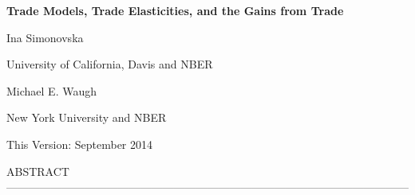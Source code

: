 \documentclass[12pt,dvips, ps2pdf]{article}
\begin{document}
\begin{onehalfspacing}

\large \textbf{Trade Models, Trade Elasticities, and the Gains from Trade}



\vspace{0.5cm}

\normalsize Ina Simonovska

\vspace{-0.3cm}

University of California, Davis and NBER

\vspace{0.5cm}

Michael E. Waugh

\vspace{-0.3cm}

New York University and NBER

\vspace{0.5cm}

This Version: September 2014

\vspace{1.5cm}

\normalsize

ABSTRACT ------------------------------------------------------------------------------------------------------------



\end{onehalfspacing}
\end{document}

